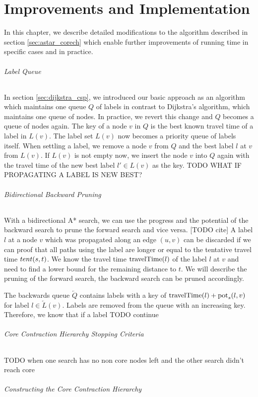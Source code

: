 
\chapter{Improvements and Implementation}
In this chapter, we describe detailed modifications to the algorithm described in section \ref{sec:astar_corech} which enable further improvements of running time in specific cases and in practice.

\subparagraph{Label Queue}
In section \ref{sec:dijkstra_csp}, we introduced our basic approach as an algorithm which maintains one queue $Q$ of labels in contrast to Dijkstra's algorithm, which maintains one queue of nodes. In practice, we revert this change and $Q$ becomes a queue of nodes again. The key of a node $v$ in $Q$ is the best known travel time of a label in $L(v)$. The label set $L(v)$ now becomes a priority queue of labels itself. When settling a label, we remove a node $v$ from $Q$ and the best label $l$ at $v$ from $L(v)$. If $L(v)$ is not empty now, we insert the node $v$ into $Q$ again with the travel time of the new best label $l' \in L(v)$ as the key. TODO WHAT IF PROPAGATING A LABEL IS NEW BEST?

\subparagraph{Bidirectional Backward Pruning}
With a bidirectional A* search, we can use the progress and the potential of the backward search to prune the forward search and vice versa. [TODO cite] A label $l$ at a node $v$ which was propagated along an edge $(u,v)$ can be discarded if we can proof that all paths using the label are longer or equal to the tentative travel time $tent(s,t)$. We know the travel time $\operatorname{travelTime}(l)$ of the label $l$ at $v$ and need to find a lower bound for the remaining distance to $t$. We will describe the pruning of the forward search, the backward search can be pruned accordingly.

The backwards queue $\overleftarrow{Q}$ contains labels with a key of $\operatorname{travelTime}(l) + \operatorname{pot}_s(l,v)$ for label $l \in \overleftarrow{L}(v)$. Labels are removed from the queue with an increasing key. Therefore, we know that if a label  TODO continue

\subparagraph{Core Contraction Hierarchy Stopping Criteria}
TODO when one search has no non core nodes left and the other search didn't reach core
\subparagraph{Constructing the Core Contraction Hierarchy}
